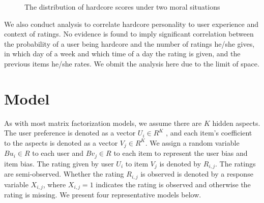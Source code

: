 \documentclass{sig-alternate}
\begin{document}
\begin{figure}[htbp]
\centering
\centering
{}
\caption{The distribution of hardcore scores under two moral situations}
\label{fig:moralbasis}
\end{figure}

We also conduct analysis to correlate hardcore personality to user experience and context of ratings. No evidence is found to imply significant correlation between the probability of a user being hardcore and the number of ratings he/she gives, in which day of a week and which time of a day the rating is given, and the previous items he/she rates. We obmit the analysis here due to the limit of space.

\section{Model}\label{sec:model}





As with most matrix factorization models, we assume there are $K$ hidden aspects. The user preference is denoted as a vector $U_i\in R^K$ , and each item's coefficient to the aspects is denoted as a vector $V_j \in R^K$. We assign a random variable $Bu_i\in R$ to each user and $Bv_j\in R$ to each item to represent the user bias and item bias. The rating given by user $U_i$ to item $V_j$ is denoted by $R_{i,j}$. The ratings are semi-observed. Whether the rating $R_{i,j}$ is observed is denoted by a response variable $X_{i,j}$, where $X_{i,j}=1$ indicates the rating is observed and otherwise the rating is missing. We present four representative models below.
\end{document}
